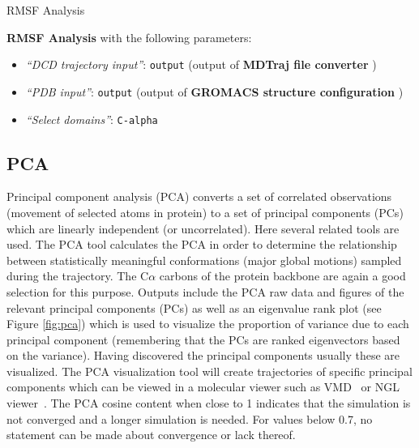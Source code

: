\documentclass[twocolumn]{bmcart}%
\providecommand{\tightlist}{%
  \setlength{\itemsep}{0pt}\setlength{\parskip}{0pt}}
\begin{document}
\begin{handson_box_colour}{RMSF Analysis}



  \textbf{RMSF Analysis} with the following parameters:

  \begin{itemize}
  \tightlist
  \item
    \emph{``DCD trajectory input''}: \texttt{output} (output of
    \textbf{MDTraj file converter} )
  \item
    \emph{``PDB input''}: \texttt{output} (output of \textbf{GROMACS
    structure configuration} )
  \item
    \emph{``Select domains''}: \texttt{C-alpha}
  \end{itemize}



\end{handson_box_colour}


\hypertarget{pca-analysis}{%
\subsection*{PCA}\label{pca-analysis}}

Principal component analysis (PCA) converts a set of correlated
observations (movement of selected atoms in protein) to a set of principal
components (PCs) which are linearly independent (or uncorrelated). Here several related tools are used. 
The PCA tool calculates the PCA in order to determine the relationship between statistically meaningful conformations (major global motions) sampled during the trajectory. The C$\alpha$ carbons of the protein backbone are again a good selection for this purpose.  Outputs include the PCA raw data and figures of the relevant principal components (PCs) as well as an eigenvalue rank plot (see Figure \ref{fig:pca}) which is used to visualize the proportion of variance due to each principal component (remembering that the PCs are ranked eigenvectors based on the variance). 
Having discovered the principal components usually these are visualized. The PCA visualization tool will create trajectories of specific principal components which can be viewed in a molecular viewer such as VMD~\cite{hump_vmd_1996} or NGL viewer~\cite{Rose2018ngl}. The PCA cosine content when close to 1 indicates that the simulation is not converged and a longer simulation is needed. For values below 0.7, no statement can be made about convergence or lack thereof. 
\end{document}
